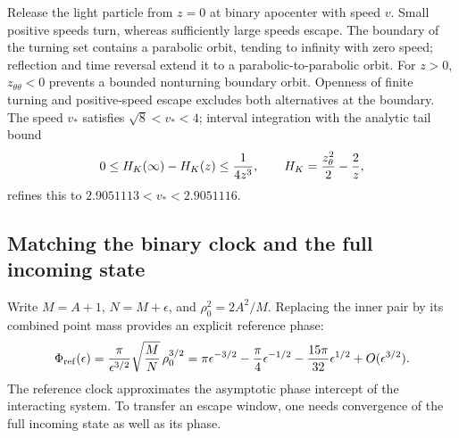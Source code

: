 Release the light particle from $z=0$ at binary apocenter with speed $v$.
Small positive speeds turn, whereas sufficiently large speeds escape.
The boundary of the turning set contains a parabolic orbit, tending to
infinity with zero speed; reflection and time reversal extend it to a
parabolic-to-parabolic orbit. For $z>0$, $z_{\theta\theta}<0$ prevents a
bounded nonturning boundary orbit. Openness of finite turning and
positive-speed escape excludes both alternatives at the boundary.
The speed $v_*$ satisfies $\sqrt8<v_*<4$; interval integration with the
analytic tail bound
\[
 0\le H_K(\infty)-H_K(z)\le{1\over4z^3},\qquad
 H_K={z_\theta^2\over2}-{2\over z},
\]
refines this to $2.9051113<v_*<2.9051116$.

\subsection{Matching the binary clock and the full incoming state}

Write $M=A+1$, $N=M+\epsilon$, and
$\rho_0^2=2A^2/M$. Replacing the inner pair by its combined point mass
provides an explicit reference phase:
\begin{equation}\label{eq:clock}
 \Phi_{\rm ref}(\epsilon)
 ={\pi\over\epsilon^{3/2}}\sqrt{M\over N}\,\rho_0^{3/2}
 =\pi\epsilon^{-3/2}-{\pi\over4}\epsilon^{-1/2}
   -{15\pi\over32}\epsilon^{1/2}+O(\epsilon^{3/2}).
\end{equation}
The reference clock approximates the asymptotic phase intercept of the
interacting system. To transfer an escape window, one needs convergence
of the full incoming state as well as its phase.

